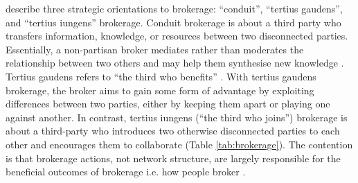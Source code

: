 \citet{obstfeld2014brokerage} describe three strategic orientations to brokerage: \enquote{conduit}, \enquote{tertius gaudens}, and \enquote{tertius iungens} brokerage. Conduit brokerage is about a third party who transfers information, knowledge, or resources between two disconnected parties. Essentially, a non-partisan broker mediates rather than moderates the relationship between two others and may help them synthesise new knowledge \citep{simmel1950sociology,grosser2019measuring}. Tertius gaudens refers to \enquote{the third who benefits} \citep{simmel1950sociology}. With tertius gaudens brokerage, the broker aims to gain some form of advantage by exploiting differences between two parties, either by keeping them apart or playing one against another. In contrast, tertius iungens (\enquote{the third who joins}) brokerage is about a third-party who introduces two otherwise disconnected parties to each other and encourages them to collaborate (Table \ref{tab:brokerage}). The contention is that brokerage actions, not network structure, are largely responsible for the beneficial outcomes of brokerage i.e. how people broker \citep{grosser2019measuring}. \medskip

